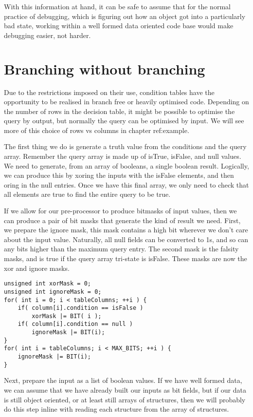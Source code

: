 With this information at hand, it can be safe to assume that for the normal
practice of debugging, which is figuring out how an object got into a
particularly bad state, working within a well formed data oriented code base
would make debugging easier, not harder.

\section{Branching without branching}

Due to the restrictions imposed on their use, condition tables have the
opportunity to be realised in branch free or heavily optimised code. Depending
on the number of rows in the decision table, it might be possible to optimise
the query by output, but normally the query can be optimised by input. We will
see more of this choice of rows vs columns in chapter {ref:example}.

The first thing we do is generate a truth value from the conditions and the
query array. Remember the query array is made up of isTrue, isFalse, and null
values.  We need to generate, from an array of booleans, a single boolean
result. Logically, we can produce this by xoring the inputs with the isFalse
elements, and then oring in the null entries. Once we have this final array, we
only need to check that all elements are true to find the entire query to be
true.

If we allow for our pre-processor to produce bitmasks of input values, then we
can produce a pair of bit masks that generate the kind of result we need.
First, we prepare the ignore mask, this mask contains a high bit wherever we
don't care about the input value. Naturally, all null fields can be converted
to 1s, and so can any bits higher than the maximum query entry.  The second
mask is the falsity masks, and is true if the query array tri-state is isFalse.
These masks are now the xor and ignore masks.

\begin{lstlisting}
unsigned int xorMask = 0;
unsigned int ignoreMask = 0;
for( int i = 0; i < tableColumns; ++i ) {
	if( column[i].condition == isFalse )
		xorMask |= BIT( i );
	if( column[i].condition == null )
		ignoreMask |= BIT(i);
}
for( int i = tableColumns; i < MAX_BITS; ++i ) {
	ignoreMask |= BIT(i);
}
\end{lstlisting}

Next, prepare the input as a list of boolean values. If we have well formed
data, we can assume that we have already built our inputs as bit fields, but if
our data is still object oriented, or at least still arrays of structures, then
we will probably do this step inline with reading each structure from the array
of structures.

